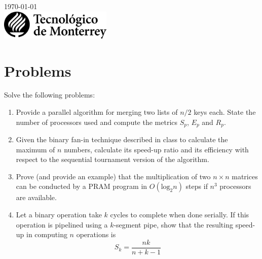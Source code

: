 \documentclass{article}
\begin{document}
\begin{titlepage}


    {\large \today}\\[2cm] %


    \includegraphics[width=0.4\textwidth,height=\textheight,keepaspectratio]{logo-tec-negro.png} %


    \vfill %

\end{titlepage}


\section{Problems}
Solve the following problems:
\begin{enumerate}
    \item Provide a parallel algorithm for merging two lists of $n/2$ keys each. State the number of processors used and compute the metrics $S_p$, $E_p$ and $R_p$.
    \item Given the binary fan-in technique described in class to calculate the maximum of $n$ numbers, calculate its speed-up ratio and its efficiency with respect to the sequential tournament version of the algorithm.
    \item Prove (and provide an example) that the multiplication of two $n \times n$ matrices can be conducted by a PRAM program in $O(\text{log}_2 n)$ steps if $n^3$ processors are available.
    \item Let a binary operation take $k$ cycles to complete when done serially. If this operation is pipelined using a $k$-segment pipe, show that the resulting speed-up in computing $n$ operations is
    \begin{equation*}
        S_k = \frac{nk}{n + k - 1}
    \end{equation*}
    
\end{enumerate}
\end{document}
